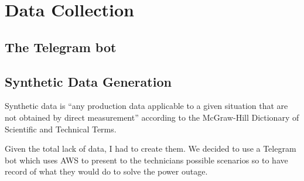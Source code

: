 \chapter{Data Collection}


\section{The Telegram bot}



\section{Synthetic Data Generation}

Synthetic data is ``any production data applicable to a given situation that are not obtained by direct measurement'' according to the McGraw-Hill Dictionary of Scientific and Technical Terms.

Given the total lack of data, I had to create them. We decided to use a Telegram bot which uses AWS to present to the technicians possible scenarios so to have record of what they would do to solve the power outage.